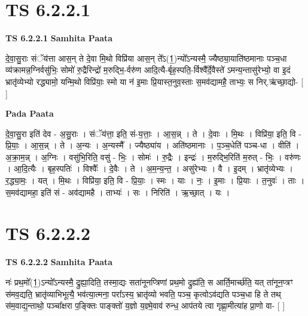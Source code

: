 \documentclass[17pt]{extarticle}
\begin{document}
\section{ TS 6.2.2.1 }

\textbf{TS 6.2.2.1 } \newline
\textbf{Samhita Paata} \newline

दे॒वा॒सु॒राः संॅय॑त्ता आस॒न् ते दे॒वा मि॒थो विप्रि॑या आस॒न् ते᳚ऽ(1॒)न्यो᳚ऽन्यस्मै॒ ज्यैष्ठ्या॒याति॑ष्ठमानाः पञ्च॒धा व्य॑क्रामन्न॒ग्निर्वसु॑भिः॒ सोमो॑ रु॒द्रैरिन्द्रो॑ म॒रुद्भि॒-र्वरु॑ण आदि॒त्यै-र्बृह॒स्पति॒-र्विश्वै᳚र्दे॒वैस्ते॑ ऽमन्य॒न्तासु॑रेभ्यो॒ वा इ॒दं भ्रातृ॑व्येभ्यो रद्ध्यामो॒ यन्मि॒थो विप्रि॑याः॒ स्मो या न॑ इ॒माः प्रि॒यास्त॒नुव॒स्ताः स॒मव॑द्यामहै॒ ताभ्यः॒ स निर्.ऋ॑च्छा॒द्यो- [  ] \newline

\textbf{Pada Paata} \newline

दे॒वा॒सु॒रा इति॑ देव - अ॒सु॒राः । संॅय॑त्ता॒ इति॒ सं-य॒त्ताः॒ । आ॒स॒न्न् । ते । दे॒वाः । मि॒थः । विप्रि॑या॒ इति॒ वि - प्रि॒याः॒ । आ॒स॒न्न् । ते । अ॒न्यः । अ॒न्यस्मै᳚ । ज्यैष्ठ्या॑य । अति॑ष्ठमानाः । प॒ञ्च॒धेति॑ पञ्च-धा । वीति॑ । अ॒क्रा॒म॒न्न् । अ॒ग्निः । वसु॑भि॒रिति॒ वसु॑ - भिः॒ । सोमः॑ । रु॒द्रैः । इन्द्रः॑ । म॒रुद्भि॒रिति॑ म॒रुत् - भिः॒ । वरु॑णः । आ॒दि॒त्यैः । बृह॒स्पतिः॑ । विश्वैः᳚ । दे॒वैः । ते । अ॒म॒न्य॒न्त॒ । असु॑रेभ्यः । वै । इ॒दम् । भ्रातृ॑व्येभ्यः । र॒द्ध्या॒मः॒ । यत् । मि॒थः । विप्रि॑या॒ इति॒ वि - प्रि॒याः॒ । स्मः । याः । नः॒ । इ॒माः । प्रि॒याः । त॒नुवः॑ । ताः । स॒मव॑द्यामहा॒ इति॑ सं - अव॑द्यामहै । ताभ्यः॑ । सः । निरिति॑ । ऋ॒च्छा॒त् । यः ।  \newline





\section{ TS 6.2.2.2 }

\textbf{TS 6.2.2.2 } \newline
\textbf{Samhita Paata} \newline

नः॑ प्रथ॒मो᳚(1॒)ऽन्यो᳚ऽन्यस्मै॒ द्रुह्या॒दिति॒ तस्मा॒द्यः सता॑नूनप्त्रिणां प्रथ॒मो द्रुह्य॑ति॒ स आर्ति॒मार्च्छ॑ति॒ यत् ता॑नून॒प्त्रꣳ स॑मव॒द्यति॒ भ्रातृ॑व्याभिभूत्यै॒ भव॑त्या॒त्मना॒ परा᳚ऽस्य॒ भ्रातृ॑व्यो भवति॒ पञ्च॒ कृत्वोऽव॑द्यति पञ्च॒धा हि ते तथ् स॑म॒वाद्य॒न्ताथो॒ पञ्चा᳚क्षरा प॒ङ्क्तिः पाङ्क्तो॑ य॒ज्ञो य॒ज्ञ्मे॒वाव॑ रुन्ध॒ आप॑तये त्वा गृह्णा॒मीत्या॑ह प्रा॒णो वा- [  ] \newline
\end{document}
